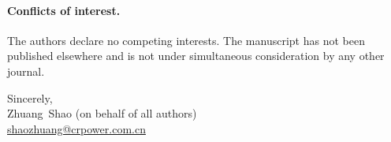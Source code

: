 \documentclass[11pt,a4paper]{article}
\begin{document}
\paragraph{Conflicts of interest.} The authors declare no competing interests. The manuscript has not been published elsewhere and is not under simultaneous consideration by any other journal.

\vspace{1em}
\begin{flushright}
Sincerely,\\[1em]
Zhuang~Shao (on behalf of all authors)\\
\href{mailto:shaozhuang@crpower.com.cn}{shaozhuang@crpower.com.cn}
\end{flushright}
\end{document}
